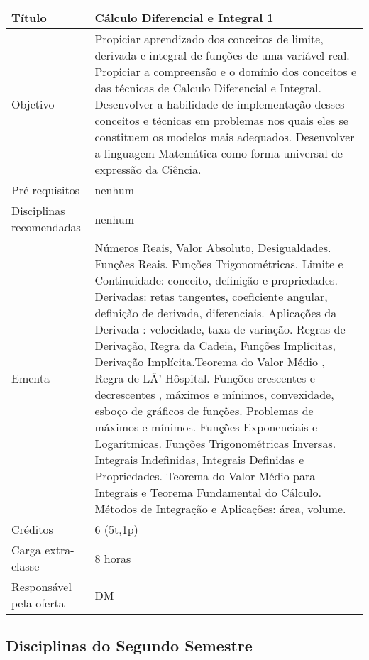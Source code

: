 

\begin{tabular}{|p{4.5cm}|p{10.0cm}|} \hline

Título & Cálculo Diferencial e Integral 1 \\ \hline
Objetivo & Propiciar aprendizado dos conceitos de limite, derivada e integral de funções de uma variável real. Propiciar a compreensão e o domínio dos conceitos e das técnicas de Calculo Diferencial e Integral. Desenvolver a habilidade de implementação desses conceitos e técnicas em problemas nos quais eles se constituem os modelos mais adequados. Desenvolver a linguagem Matemática como forma universal de expressão da Ciência. \\ \hline
Pré-requisitos & nenhum \\ \hline
Disciplinas recomendadas & nenhum \\ \hline
Ementa & Números Reais, Valor Absoluto, Desigualdades. Funções Reais.   Funções Trigonométricas. Limite e Continuidade: conceito, definição e propriedades. Derivadas: retas tangentes, coeficiente angular, definição de derivada, diferenciais. Aplicações da Derivada : velocidade, taxa de variação.   Regras de Derivação, Regra da Cadeia, Funções Implícitas, Derivação Implícita.Teorema do Valor Médio , Regra de LÂ’ Hôspital.    Funções crescentes e decrescentes , máximos e mínimos, convexidade, esboço de gráficos de funções. Problemas de máximos e mínimos. Funções Exponenciais e Logarítmicas. Funções Trigonométricas Inversas.   Integrais Indefinidas, Integrais Definidas e Propriedades.    Teorema do Valor Médio para Integrais e Teorema Fundamental do Cálculo.    Métodos de Integração e Aplicações: área, volume. \\ \hline
Créditos & 6 (5t,1p) \\ \hline
Carga extra-classe & 8 horas \\ \hline
Responsável pela oferta & DM \\ \hline
\end{tabular}


\subsection{Disciplinas do Segundo Semestre}


